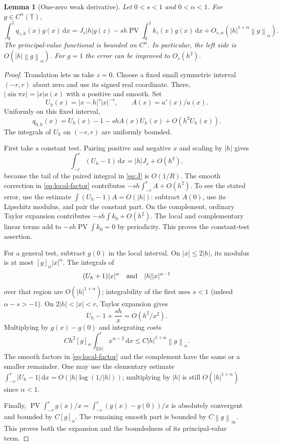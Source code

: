 \documentclass[11pt,a4paper]{article}
\numberwithin{equation}{section}
\newtheorem{lemma}[lemma]{Lemma}
\theoremstyle{definition}
\theoremstyle{remark}
\newcommand{\TT}{\mathbb T}
\newcommand{\dd}{\,\mathrm d}
\newcommand{\PV}{\operatorname{PV}}
\newcommand{\norm}[1]{\left\lVert#1\right\rVert}
\begin{document}
\begin{lemma}[One-zero weak derivative]
\label{lem:onezero}
Let $0<s<1$ and $0<\alpha<1$. For $g\in C^\alpha(\TT)$,
\begin{equation}
 \int_0^1q_{z,h}(x)g(x)\dd x
 =J_s|h|g(z)-sh\PV\!\int_0^1 k_z(x)g(x)\dd x
     +O_{s,\alpha}(|h|^{1+\alpha}\norm g_\alpha).
 \label{eq:onezero}
\end{equation}
The principal-value functional is bounded on $C^\alpha$. In particular,
the left side is $O(|h|\norm g_\alpha)$.
For $g=1$ the error can be improved to $O_s(h^2)$.
\end{lemma}
\begin{proof}
Translation lets us take $z=0$. Choose a fixed small symmetric interval
$(-r,r)$ about zero and use its signed real coordinate. There,
$|\sin\pi x|=|x|a(x)$ with $a$ positive and smooth. Set
\[
 U_h(x)=|x-h|^s|x|^{-s},\qquad A(x)=a'(x)/a(x).
\]
Uniformly on this fixed interval,
\begin{equation}
 q_{0,h}(x)=U_h(x)-1-shA(x)U_h(x)+O(h^2U_h(x)).
 \label{eq:local-factor}
\end{equation}
The integrals of $U_h$ on $(-r,r)$ are uniformly bounded.

First take a constant test. Pairing positive and negative $x$ and
scaling by $|h|$ gives
\[
 \int_{-r}^{r}(U_h-1)\dd x
 =|h|J_s+O(h^2),
\]
because the tail of the paired integral in \cref{eq:J} is $O(1/R)$.
The smooth correction in \cref{eq:local-factor} contributes
$-sh\int_{-r}^{r}A+O(h^2)$. To see the stated error, use the estimate
$\int(U_h-1)A=O(|h|)$: subtract $A(0)$, use its Lipschitz modulus,
and pair the constant part. On the complement, ordinary Taylor
expansion contributes $-sh\int k_0+O(h^2)$.
The local and complementary linear terms add to
$-sh\PV\int k_0=0$ by periodicity. This proves the constant-test
assertion.

For a general test, subtract $g(0)$ in the local interval. On
$|x|\leq2|h|$, its modulus is at most $[g]_\alpha|x|^\alpha$.
The integrals of
\[
 (U_h+1)|x|^\alpha
 \quad\hbox{and}\quad |h||x|^{\alpha-1}
\]
over that region are $O(|h|^{1+\alpha})$; integrability of the first
uses $s<1$ (indeed $\alpha-s>-1$). On
$2|h|<|x|<r$, Taylor expansion gives
\[
 U_h-1+\frac{sh}{x}=O(h^2/x^2).
\]
Multiplying by $g(x)-g(0)$ and integrating costs
\[
 C h^2[g]_\alpha\int_{2|h|}^{r}x^{\alpha-2}\dd x
 \leq C|h|^{1+\alpha}\norm g_\alpha.
\]
The smooth factors in \cref{eq:local-factor} and the complement have
the same or a smaller remainder. One may use the elementary estimate
$\int_{-r}^{r}|U_h-1|\dd x=O(|h|\log(1/|h|))$; multiplying by
$|h|$ is still $O(|h|^{1+\alpha})$ since $\alpha<1$.

Finally,
$\PV\int_{-r}^{r}g(x)/x=\int_{-r}^{r}(g(x)-g(0))/x$ is absolutely
convergent and bounded by $C[g]_\alpha$. The remaining smooth part is
bounded by $C\norm g_\infty$. This proves both the expansion and the
boundedness of its principal-value term.
\end{proof}
\end{document}
